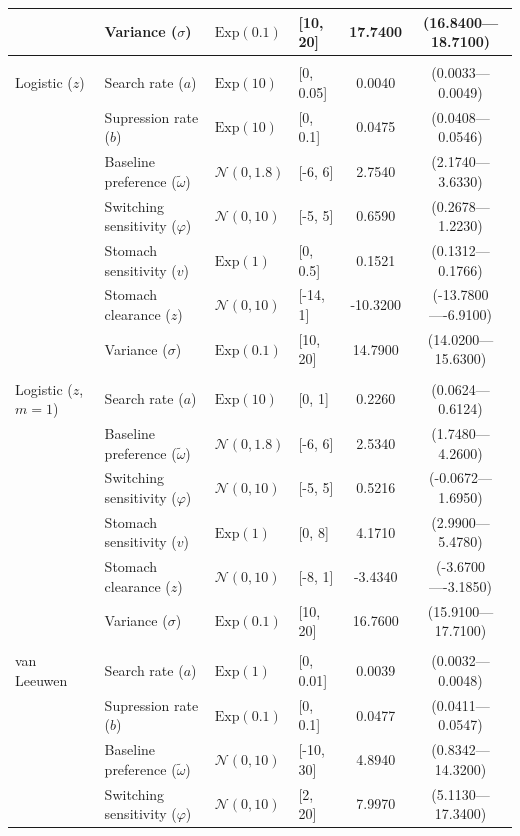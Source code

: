 \begin{longtable}{@{} llllcc @{}}
 & Variance ($\sigma$) & $\text{Exp}(0.1)$ & [10, 20] & 17.7400 & (16.8400---18.7100) \\
\hline \\[-1.8ex]
Logistic ($z$) & Search rate ($a$) & $\text{Exp}(10)$ & [0, 0.05] & 0.0040 & (0.0033---0.0049) \\
 & Supression rate ($b$) & $\text{Exp}(10)$ & [0, 0.1] & 0.0475 & (0.0408---0.0546) \\
 & Baseline preference ($\tilde{\omega}$) & $\mathcal{N}(0, 1.8)$ & [-6, 6] & 2.7540 & (2.1740---3.6330) \\
 & Switching sensitivity ($\varphi$) & $\mathcal{N}(0, 10)$ & [-5, 5] & 0.6590 & (0.2678---1.2230) \\
 & Stomach sensitivity ($v$) & $\text{Exp}(1)$ & [0, 0.5] & 0.1521 & (0.1312---0.1766) \\
 & Stomach clearance ($z$) & $\mathcal{N}(0, 10)$ & [-14, 1] & -10.3200 & (-13.7800----6.9100) \\
 & Variance ($\sigma$) & $\text{Exp}(0.1)$ & [10, 20] & 14.7900 & (14.0200---15.6300) \\
\hline \\[-1.8ex]
Logistic ($z$, $m=1$) & Search rate ($a$) & $\text{Exp}(10)$ & [0, 1] & 0.2260 & (0.0624---0.6124) \\
 & Baseline preference ($\tilde{\omega}$) & $\mathcal{N}(0, 1.8)$ & [-6, 6] & 2.5340 & (1.7480---4.2600) \\
 & Switching sensitivity ($\varphi$) & $\mathcal{N}(0, 10)$ & [-5, 5] & 0.5216 & (-0.0672---1.6950) \\
 & Stomach sensitivity ($v$) & $\text{Exp}(1)$ & [0, 8] & 4.1710 & (2.9900---5.4780) \\
 & Stomach clearance ($z$) & $\mathcal{N}(0, 10)$ & [-8, 1] & -3.4340 & (-3.6700----3.1850) \\
 & Variance ($\sigma$) & $\text{Exp}(0.1)$ & [10, 20] & 16.7600 & (15.9100---17.7100) \\
\hline \\[-1.8ex]
van Leeuwen & Search rate ($a$) & $\text{Exp}(1)$ & [0, 0.01] & 0.0039 & (0.0032---0.0048) \\
 & Supression rate ($b$) & $\text{Exp}(0.1)$ & [0, 0.1] & 0.0477 & (0.0411---0.0547) \\
 & Baseline preference ($\tilde{\omega}$) & $\mathcal{N}(0, 10)$ & [-10, 30] & 4.8940 & (0.8342---14.3200) \\
 & Switching sensitivity ($\varphi$) & $\mathcal{N}(0, 10)$ & [2, 20] & 7.9970 & (5.1130---17.3400) \\

\end{longtable}
